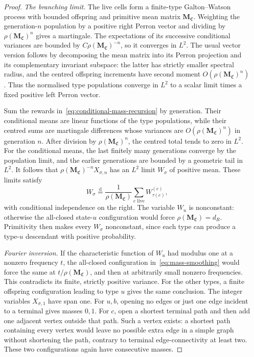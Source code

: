 \documentclass[scheme=plain,11pt]{ctexart}
\theoremstyle{definition}
\theoremstyle{remark}
\begin{document}
\begin{proof}
\emph{The branching limit.}
The live cells form a finite-type Galton--Watson process with bounded offspring and primitive mean matrix $\mathbf M_{\mathfrak C}$.
Weighting the generation-$n$ population by a positive right Perron vector and dividing by $\rho(\mathbf M_{\mathfrak C})^n$ gives a martingale.
The expectations of its successive conditional variances are bounded by $C\rho(\mathbf M_{\mathfrak C})^{-n}$, so it converges in $L^2$.
The usual vector version follows by decomposing the mean matrix into its Perron projection and its complementary invariant subspace: the latter has strictly smaller spectral radius, and the centred offspring increments have second moment $O(\rho(\mathbf M_{\mathfrak C})^n)$.
Thus the normalised type populations converge in $L^2$ to a scalar limit times a fixed positive left Perron vector.

Sum the rewards in~\eqref{eq:conditional-mass-recursion} by generation.
Their conditional means are linear functions of the type populations, while their centred sums are martingale differences whose variances are $O(\rho(\mathbf M_{\mathfrak C})^n)$ in generation $n$.
After division by $\rho(\mathbf M_{\mathfrak C})^n$, the centred total tends to zero in $L^2$.
For the conditional means, the last finitely many generations converge by the population limit, and the earlier generations are bounded by a geometric tail in $L^2$.
It follows that $\rho(\mathbf M_{\mathfrak C})^{-n}X_{\sigma,n}$ has an $L^2$ limit $W_\sigma$ of positive mean.
These limits satisfy
\begin{equation}\label{eq:mass-smoothing}
 W_\sigma\overset{\mathrm d}=
 \frac1{\rho(\mathbf M_{\mathfrak C})}
 \sum_{e\text{ live}}W_{\tau(e)}^{(e)},
\end{equation}
with conditional independence on the right.
The variable $W_u$ is nonconstant: otherwise the all-closed state-$u$ configuration would force $\rho(\mathbf M_{\mathfrak C})=d_R$.
Primitivity then makes every $W_\sigma$ nonconstant, since each type can produce a type-$u$ descendant with positive probability.

\emph{Fourier inversion.}
If the characteristic function of $W_u$ had modulus one at a nonzero frequency $t$, the all-closed configuration in~\eqref{eq:mass-smoothing} would force the same at $t/\rho(\mathbf M_{\mathfrak C})$, and then at arbitrarily small nonzero frequencies.
This contradicts its finite, strictly positive variance.
For the other types, a finite offspring configuration leading to type $u$ gives the same conclusion.
The integer variables $X_{\sigma,1}$ have span one.
For $u,b$, opening no edges or just one edge incident to a terminal gives masses $0,1$.
For $c$, open a shortest terminal path and then add one adjacent vertex outside that path.
Such a vertex exists: a shortest path containing every vertex would leave no possible extra edge in a simple graph without shortening the path, contrary to terminal edge-connectivity at least two.
These two configurations again have consecutive masses.


\end{proof}
\end{document}
